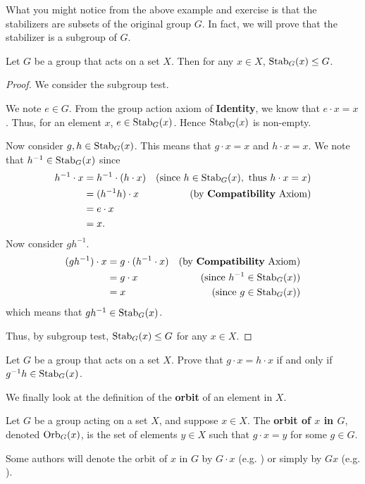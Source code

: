 What you might notice from the above example and exercise is that the stabilizers are subsets of the original group $G$. In fact, we will prove that the stabilizer is a subgroup of $G$.
\begin{lemma}\label{lemma-stabilizer-is-subgroup}
    Let $G$ be a group that acts on a set $X$. Then for any $x \in X$, $\mathrm{Stab}_{G}(x) \leq G$.
\end{lemma}
\begin{proof}
    We consider the subgroup test.

    We note $e \in G$. From the group action axiom of \textbf{Identity}, we know that $e \cdot x = x$. Thus, for an element $x$, $e \in \mathrm{Stab}_{G}(x)$. Hence $\mathrm{Stab}_{G}(x)$ is non-empty.

    Now consider $g, h \in \mathrm{Stab}_{G}(x)$. This means that $g\cdot x = x$ and $h \cdot x = x$. We note that $h^{-1} \in \mathrm{Stab}_{G}(x)$ since
    \begin{align*}
        h^{-1} \cdot x &= h^{-1} \cdot (h \cdot x) & \text{(since } h \in \mathrm{Stab}_{G}(x), \text{ thus } h\cdot x = x)\\
        &= (h^{-1}h) \cdot x & \text{(by \textbf{Compatibility} Axiom)}\\
        &= e \cdot x\\
        &= x.
    \end{align*}
    Now consider $gh^{-1}$.
    \begin{align*}
        (gh^{-1}) \cdot x &= g \cdot (h^{-1} \cdot x) & \text{(by \textbf{Compatibility} Axiom)}\\
        &= g \cdot x & \text{(since } h^{-1} \in \mathrm{Stab}_{G}(x))\\
        &= x & \text{(since } g \in \mathrm{Stab}_{G}(x))
    \end{align*}
    which means that $gh^{-1} \in \mathrm{Stab}_{G}(x)$.

    Thus, by subgroup test, $\mathrm{Stab}_{G}(x) \leq G$ for any $x \in X$.
\end{proof}

\begin{exercise}\label{exercise-group-action-equivalence}
    Let $G$ be a group that acts on a set $X$. Prove that $g \cdot x = h \cdot x$ if and only if $g^{-1}h \in \mathrm{Stab}_{G}(x)$.
\end{exercise}

We finally look at the definition of the \textbf{orbit} of an element in $X$.
\begin{definition}
    Let $G$ be a group acting on a set $X$, and suppose $x \in X$. The \textbf{orbit of $x$ in $G$}, denoted $\mathrm{Orb}_{G}(x)$, is the set of elements $y \in X$ such that $g \cdot x = y$ for some $g \in G$.
\end{definition}
\begin{remark}
    Some authors will denote the orbit of $x$ in $G$ by $G \cdot x$ (e.g. \cite{clark_1984}) or simply by $Gx$ (e.g. \cite{milne_2021}).
\end{remark}

